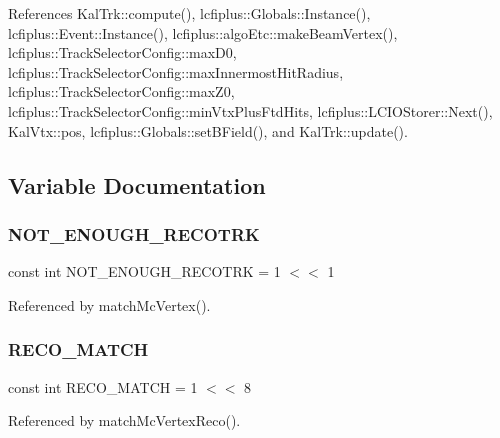 References Kal\+Trk\+::compute(), lcfiplus\+::\+Globals\+::\+Instance(), lcfiplus\+::\+Event\+::\+Instance(), lcfiplus\+::algo\+Etc\+::make\+Beam\+Vertex(), lcfiplus\+::\+Track\+Selector\+Config\+::max\+D0, lcfiplus\+::\+Track\+Selector\+Config\+::max\+Innermost\+Hit\+Radius, lcfiplus\+::\+Track\+Selector\+Config\+::max\+Z0, lcfiplus\+::\+Track\+Selector\+Config\+::min\+Vtx\+Plus\+Ftd\+Hits, lcfiplus\+::\+L\+C\+I\+O\+Storer\+::\+Next(), Kal\+Vtx\+::pos, lcfiplus\+::\+Globals\+::set\+B\+Field(), and Kal\+Trk\+::update().



\subsection{Variable Documentation}
\mbox{\label{Driver_8cc_aebb701d066fa610c891cb6ff804f30f3}} 
\subsubsection{N\+O\+T\+\_\+\+E\+N\+O\+U\+G\+H\+\_\+\+R\+E\+C\+O\+T\+RK}
{\footnotesize\ttfamily const int N\+O\+T\+\_\+\+E\+N\+O\+U\+G\+H\+\_\+\+R\+E\+C\+O\+T\+RK = 1 $<$$<$ 1}



Referenced by match\+Mc\+Vertex().

\mbox{\label{Driver_8cc_ab0a03d9d7ce74a41efd52fcccb0c0a43}} 
\subsubsection{R\+E\+C\+O\+\_\+\+M\+A\+T\+CH}
{\footnotesize\ttfamily const int R\+E\+C\+O\+\_\+\+M\+A\+T\+CH = 1 $<$$<$ 8}



Referenced by match\+Mc\+Vertex\+Reco().

\mbox{\label{Driver_8cc_a25af212f715bec9d04db92974026c713}} 

